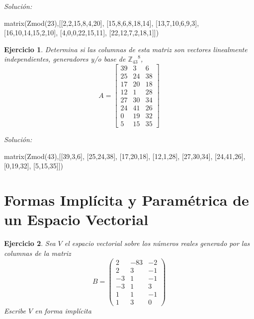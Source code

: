 \documentclass{amsart}
\newtheorem{ejer}{Ejercicio}
\begin{document}
{\it Soluci\'on:}

\begin{sageblock}
matrix(Zmod(23),[[2,2,15,8,4,20],
[15,8,6,8,18,14],
[13,7,10,6,9,3],
[16,10,14,15,2,10],
[4,0,0,22,15,11],
[22,12,7,2,18,1]])
\end{sageblock}



\begin{ejer} Determina si las columnas de esta matriz son vectores linealmente independientes, generadores y/o base de ${{\mathbb Z}_{43}}^{8}$,
\[ A = \left[\begin{array}{rrr}
39 & 3 & 6 \\
25 & 24 & 38 \\
17 & 20 & 18 \\
12 & 1 & 28 \\
27 & 30 & 34 \\
24 & 41 & 26 \\
0 & 19 & 32 \\
5 & 15 & 35
\end{array}\right] \]
\end{ejer}

{\it Soluci\'on:}

\begin{sageblock}
matrix(Zmod(43),[[39,3,6],
[25,24,38],
[17,20,18],
[12,1,28],
[27,30,34],
[24,41,26],
[0,19,32],
[5,15,35]])
\end{sageblock}


\section{Formas Implícita y Paramétrica de un Espacio Vectorial}

\begin{ejer} Sea $V$ el espacio vectorial sobre los números reales 
generado por las columnas de la matriz 
\[B = \left(\begin{array}{rrr}
2 & -83 & -2 \\
2 & 3 & -1 \\
-3 & 1 & -1 \\
-3 & 1 & 3 \\
1 & 1 & -1 \\
1 & 3 & 0
\end{array}\right)\]
Escribe $V$ en forma impl\'icita 
\end{ejer}
\end{document}
